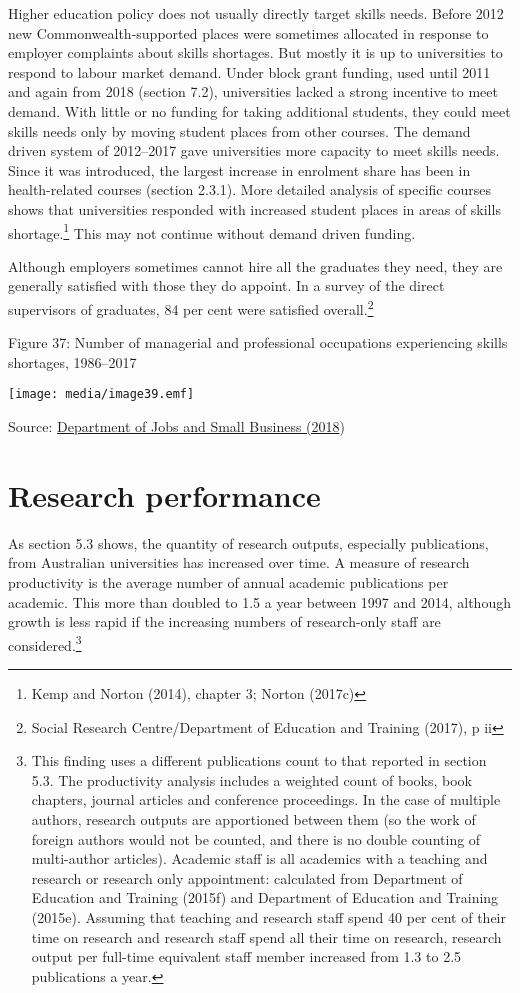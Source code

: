 \documentclass[]{book}
\begin{document}
Higher education policy does not usually directly target skills needs. Before 2012 new Commonwealth-supported places were sometimes allocated in response to employer complaints about skills shortages. But mostly it is up to universities to respond to labour market demand. Under block grant funding, used until 2011 and again from 2018 (section 7.2), universities lacked a strong incentive to meet demand. With little or no funding for taking additional students, they could meet skills needs only by moving student places from other courses. The demand driven system of 2012--2017 gave universities more capacity to meet skills needs. Since it was introduced, the largest increase in enrolment share has been in health-related courses (section 2.3.1). More detailed analysis of specific courses shows that universities responded with increased student places in areas of skills shortage.\footnote{Kemp and Norton (2014), chapter 3; Norton (2017c)} This may not continue without demand driven funding.

Although employers sometimes cannot hire all the graduates they need, they are generally satisfied with those they do appoint. In a survey of the direct supervisors of graduates, 84 per cent were satisfied overall.\footnote{Social Research Centre/Department of Education and Training (2017), p ii}

\protect\hypertarget{_Ref449096994}{}{}Figure 37: Number of managerial and professional occupations experiencing skills shortages, 1986--2017

\texttt{[image: media/image39.emf]}

Source: \protect\hyperlink{_ENREF_103}{Department of Jobs and Small Business (2018})

\hypertarget{research-performance}{%
\section{Research performance}\label{research-performance}}

As section 5.3 shows, the quantity of research outputs, especially publications, from Australian universities has increased over time. A measure of research productivity is the average number of annual academic publications per academic. This more than doubled to 1.5 a year between 1997 and 2014, although growth is less rapid if the increasing numbers of research-only staff are considered.\footnote{This finding uses a different publications count to that reported in section 5.3. The productivity analysis includes a weighted count of books, book chapters, journal articles and conference proceedings. In the case of multiple authors, research outputs are apportioned between them (so the work of foreign authors would not be counted, and there is no double counting of multi-author articles). Academic staff is all academics with a teaching and research or research only appointment: calculated from Department of Education and Training (2015f) and Department of Education and Training (2015e). Assuming that teaching and research staff spend 40 per cent of their time on research and research staff spend all their time on research, research output per full-time equivalent staff member increased from 1.3 to 2.5 publications a year.}
\end{document}
